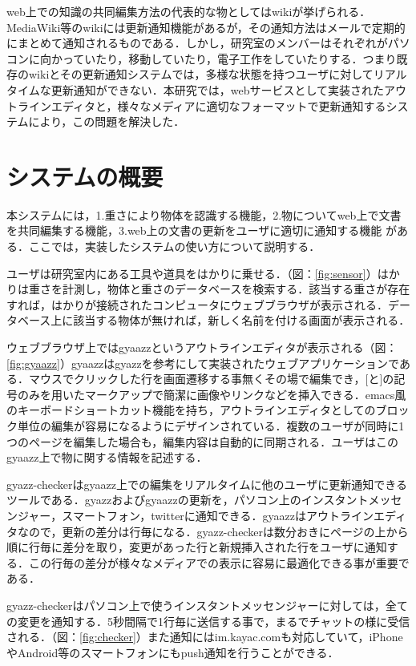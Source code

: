 web上での知識の共同編集方法の代表的な物としてはwikiが挙げられる．MediaWiki\cite{mediawiki}等のwikiには更新通知機能があるが，その通知方法はメールで定期的にまとめて通知されるものである．しかし，研究室のメンバーはそれぞれがパソコンに向かっていたり，移動していたり，電子工作をしていたりする．つまり既存のwikiとその更新通知システムでは，多様な状態を持つユーザに対してリアルタイムな更新通知ができない．本研究では，webサービスとして実装されたアウトラインエディタと，様々なメディアに適切なフォーマットで更新通知するシステムにより，この問題を解決した．


\section{システムの概要}
本システムには，1.重さにより物体を認識する機能，2.物についてweb上で文書を共同編集する機能，3.web上の文書の更新をユーザに適切に通知する機能 がある．ここでは，実装したシステムの使い方について説明する．

ユーザは研究室内にある工具や道具をはかりに乗せる．（図：\ref{fig:sensor}）はかりは重さを計測し，物体と重さのデータベースを検索する．該当する重さが存在すれば，はかりが接続されたコンピュータにウェブブラウザが表示される．データベース上に該当する物体が無ければ，新しく名前を付ける画面が表示される．

ウェブブラウザ上ではgyaazzというアウトラインエディタが表示される（図：\ref{fig:gyaazz}）gyaazzはgyazz\cite{gyazz}を参考にして実装されたウェブアプリケーションである．マウスでクリックした行を画面遷移する事無くその場で編集でき，[と]の記号のみを用いたマークアップで簡潔に画像やリンクなどを挿入できる．emacs風のキーボードショートカット機能を持ち，アウトラインエディタとしてのブロック単位の編集が容易になるようにデザインされている．複数のユーザが同時に1つのページを編集した場合も，編集内容は自動的に同期される．ユーザはこのgyaazz上で物に関する情報を記述する．

gyazz-checkerはgyaazz上での編集をリアルタイムに他のユーザに更新通知できるツールである．gyazzおよびgyaazzの更新を，パソコン上のインスタントメッセンジャー，スマートフォン，twitterに通知できる．gyaazzはアウトラインエディタなので，更新の差分は行毎になる．gyazz-checkerは数分おきにページの上から順に行毎に差分を取り，変更があった行と新規挿入された行をユーザに通知する．この行毎の差分が様々なメディアでの表示に容易に最適化できる事が重要である．

gyazz-checkerはパソコン上で使うインスタントメッセンジャーに対しては，全ての変更を通知する．5秒間隔で1行毎に送信する事で，まるでチャットの様に受信される．（図：\ref{fig:checker}）また通知にはim.kayac.com\cite{imkayac}も対応していて，iPhoneやAndroid等のスマートフォンにもpush通知を行うことができる．

